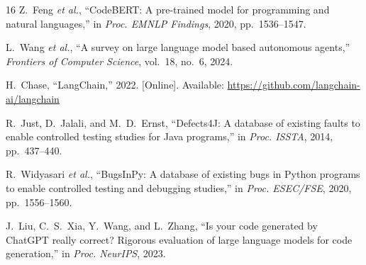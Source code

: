 \documentclass[conference]{IEEEtran}
\begin{document}
\begin{thebibliography}{16}
Z.~Feng \textit{et al.}, ``CodeBERT: A pre-trained model for programming and natural languages,'' in \textit{Proc. EMNLP Findings}, 2020, pp.~1536--1547.

L.~Wang \textit{et al.}, ``A survey on large language model based autonomous agents,'' \textit{Frontiers of Computer Science}, vol.~18, no.~6, 2024.

H.~Chase, ``LangChain,'' 2022. [Online]. Available: \url{https://github.com/langchain-ai/langchain}

R.~Just, D.~Jalali, and M.~D.~Ernst, ``Defects4J: A database of existing faults to enable controlled testing studies for Java programs,'' in \textit{Proc. ISSTA}, 2014, pp.~437--440.

R.~Widyasari \textit{et al.}, ``BugsInPy: A database of existing bugs in Python programs to enable controlled testing and debugging studies,'' in \textit{Proc. ESEC/FSE}, 2020, pp.~1556--1560.

J.~Liu, C.~S.~Xia, Y.~Wang, and L.~Zhang, ``Is your code generated by ChatGPT really correct? Rigorous evaluation of large language models for code generation,'' in \textit{Proc. NeurIPS}, 2023.

\end{thebibliography}
\end{document}
